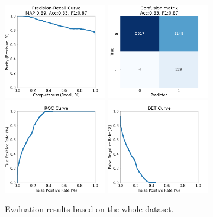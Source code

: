 \documentclass[DM,authoryear,toc]{lsstdoc}
\begin{document}
\begin{figure}[h]
  \centering
  \includegraphics[width=0.4\textwidth]{precrec_13-resnet50-FullAugmentation-scratch-B64__0255000__npy_data_0.1.2-0sigma_256by256__posw_20.png}
  \includegraphics[width=0.4\textwidth]{confmat_13-resnet50-FullAugmentation-scratch-B64__0255000__npy_data_0.1.2-0sigma_256by256__posw_20.png}
  \includegraphics[width=0.4\textwidth]{roc_13-resnet50-FullAugmentation-scratch-B64__0255000__npy_data_0.1.2-0sigma_256by256__posw_20.png}
  \includegraphics[width=0.4\textwidth]{det_13-resnet50-FullAugmentation-scratch-B64__0255000__npy_data_0.1.2-0sigma_256by256__posw_20.png}
  \caption{Evaluation results based on the whole dataset.}
  \label{fig:tract_templates}
\end{figure}
\end{document}
